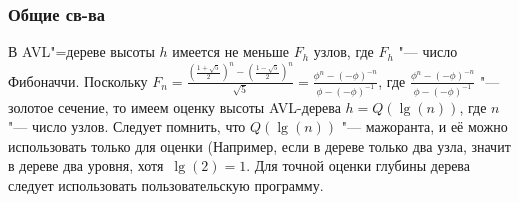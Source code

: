 \begin{frame}
    \frametitle{Общие св-ва}
    
    В AVL"=дереве высоты $h$ имеется не меньше $F_h$ узлов, где $F_h$ "--- число Фибоначчи.
    Поскольку $F_n = \frac{(\frac{1 + \sqrt{5}}{2})^n - (\frac{1 - \sqrt{5}}{2})^n}{\sqrt{5}} =
    \frac{\phi^n - (-\phi)^{-n}}{\phi - (-\phi)^{-1}}$,
    где $\frac{\phi^n - (-\phi)^{-n}}{\phi - (-\phi)^{-1}}$ "--- золотое сечение,
    то имеем оценку высоты AVL-дерева $h = Q(\lg(n))$,
    где $n$ "--- число узлов. Следует помнить, что $Q(\lg(n))$ "--- мажоранта,
    и её можно использовать только для оценки
    (Например, если в дереве только два узла, значит в дереве два уровня,
    хотя $\lg(2) = 1$. Для точной оценки глубины дерева следует использовать пользовательскую программу.
\end{frame}